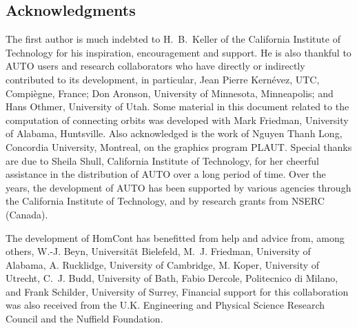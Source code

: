 \documentclass[12pt]{report}
\begin{document}
\subsection*{Acknowledgments}
The first author is much indebted to H.~B.~Keller 
of the California Institute of Technology for his inspiration,
encouragement and support.
He is also thankful to {\cal AUTO} users and research collaborators who have 
directly or indirectly contributed to its development,
in particular, 
Jean Pierre Kern\'evez, UTC, Compi\`egne, France;
Don Aronson, University of Minnesota, Minneapolis; and 
Hans Othmer, University of Utah.
Some material in this document related to the computation of connecting orbits
was developed with Mark Friedman, University of Alabama, Huntsville.
Also acknowledged is the work of Nguyen Thanh Long,
Concordia University, Montreal, on the graphics program {\cal PLAUT}.
Special thanks are due to Sheila Shull, California Institute of Technology,
for her cheerful assistance in the distribution of {\cal AUTO} over a long period
of time.
Over the years, the development of {\cal AUTO} has been supported by
various agencies through the California Institute of Technology, and
by research grants from NSERC (Canada).

The development of {\cal HomCont} has benefitted from help and advice from, 
among others, 
W.-J. Beyn, Universit\"{a}t Bielefeld,
M.~J. Friedman, University of Alabama,
A. Rucklidge, University of Cambridge, 
M. Koper, University of Utrecht,
C.~J. Budd, University of Bath,
Fabio Dercole, Politecnico di Milano, and
Frank Schilder, University of Surrey,
Financial support for this collaboration was also received from the U.K.
Engineering and Physical Science Research Council and the Nuffield Foundation.

\newpage
~
\end{document}
